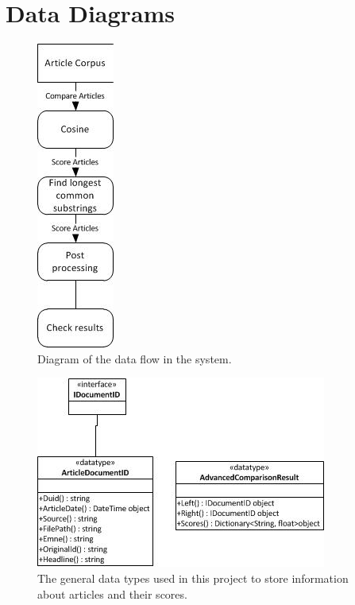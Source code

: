 \chapter{Data Diagrams}

\begin{figure}
	\centering
	\includegraphics[scale=1.0]{figures/Dataflow}
	\caption{Diagram of the data flow in the system.}
\end{figure}

\begin{figure}
	\centering
	\includegraphics[scale=1.0]{figures/Datatypes}
	\caption{The general data types used in this project to store information about articles and their scores.}
\end{figure}